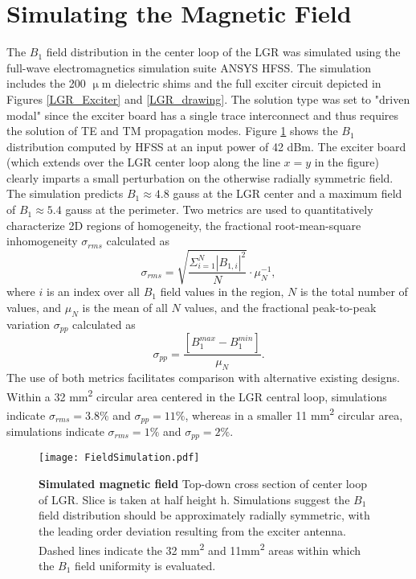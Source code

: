 \section{Simulating the Magnetic Field} \label{simField}

The $B_1$ field distribution in the center loop of the LGR was simulated using the full-wave electromagnetics simulation suite ANSYS HFSS. The simulation includes the 200 $\upmu$m dielectric shims and the full exciter circuit depicted in Figures \ref{LGR_Exciter} and \ref{LGR_drawing}. The solution type was set to "driven modal" since the exciter board has a single trace interconnect and thus requires the solution of TE and TM propagation modes. Figure \ref{LGR_simulated} shows the $B_1$ distribution computed by HFSS at an input power of 42 dBm. The exciter board (which extends over the LGR center loop along the line $x = y$ in the figure) clearly imparts a small perturbation on the otherwise radially symmetric field. The simulation predicts $B_1 \approx 4.8$ gauss at the LGR center and a maximum field of $B_1 \approx 5.4$ gauss at the perimeter. Two metrics are used to quantitatively characterize 2D regions of homogeneity, the fractional root-mean-square inhomogeneity $\sigma_{rms}$ calculated as 
\begin{equation}\label{sigma_rms}
\sigma_{rms} = \sqrt{\frac{\Sigma_{i = 1}^N|B_{1,i}|^2}{N}} \cdot \mu_N^{-1},
\end{equation}
where $i$ is an index over all $B_1$ field values in the region, $N$ is the total number of values, and $\mu_N$ is the mean of all $N$ values, and the fractional peak-to-peak variation $\sigma_{pp}$ calculated as
\begin{equation}\label{sigma_pp}
\sigma_{pp} = \frac{\left[B_1^{max} - B_1^{min}\right]}{\mu_N}.
\end{equation} 
The use of both metrics facilitates comparison with alternative existing designs. Within a 32 mm\textsuperscript{2} circular area centered in the LGR central loop, simulations indicate $\sigma_{rms} = 3.8\%$ and $\sigma_{pp} = 11\%$, whereas in a smaller 11 mm\textsuperscript{2} circular area, simulations indicate $\sigma_{rms} = 1\%$ and $\sigma_{pp} = 2\%$.

\begin{figure}[t!]
\centering
\texttt{[image: FieldSimulation.pdf]}  
\caption{\textbf{Simulated magnetic field} Top-down cross section of center loop of LGR. Slice is taken at half height h. Simulations suggest the $B_1$ field distribution
should be approximately radially symmetric, with the leading order deviation resulting from the exciter antenna. Dashed lines indicate the 32 mm\textsuperscript{2} and 11mm\textsuperscript{2} areas within which the $B_1$ field uniformity is evaluated.}
\label{LGR_simulated}
\end{figure}

